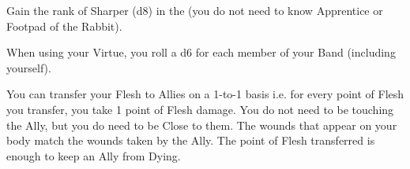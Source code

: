 \begin{multicols*}{2}

Gain the rank of Sharper (d8) in the  (you do not need to know Apprentice or Footpad of the Rabbit).


\cbreak


When using your  Virtue, you roll a d6 for each member of your Band (including yourself).


You can transfer your Flesh to Allies on a 1-to-1 basis i.e. for every point of Flesh you transfer, you take 1 point of Flesh damage. You do not need to be touching the Ally, but you do need to be Close to them.  The wounds that appear on your body match the wounds taken by the Ally.  The point of Flesh transferred is enough to keep an Ally from Dying.

\end{multicols*}
